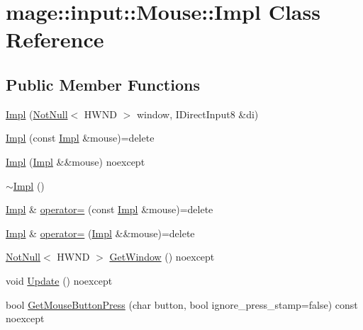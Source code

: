 \hypertarget{classmage_1_1input_1_1_mouse_1_1_impl}{}\section{mage\+:\+:input\+:\+:Mouse\+:\+:Impl Class Reference}
\label{classmage_1_1input_1_1_mouse_1_1_impl}
\subsection*{Public Member Functions}
\begin{DoxyCompactItemize}
\item 
\hyperlink{classmage_1_1input_1_1_mouse_1_1_impl_a123b86c874208b15d61eae54a2633a68}{Impl} (\hyperlink{namespacemage_a8769f9d670d6b585ea306cb1062af94b}{Not\+Null}$<$ H\+W\+ND $>$ window, I\+Direct\+Input8 \&di)
\item 
\hyperlink{classmage_1_1input_1_1_mouse_1_1_impl_a8d489809ad53f9e7310983180bc7be98}{Impl} (const \hyperlink{classmage_1_1input_1_1_mouse_1_1_impl}{Impl} \&mouse)=delete
\item 
\hyperlink{classmage_1_1input_1_1_mouse_1_1_impl_a8eed1c46d32964cb28b999b28c39a2b7}{Impl} (\hyperlink{classmage_1_1input_1_1_mouse_1_1_impl}{Impl} \&\&mouse) noexcept
\item 
\hyperlink{classmage_1_1input_1_1_mouse_1_1_impl_a0e1f64d2fadbd25d216e0495d141b867}{$\sim$\+Impl} ()
\item 
\hyperlink{classmage_1_1input_1_1_mouse_1_1_impl}{Impl} \& \hyperlink{classmage_1_1input_1_1_mouse_1_1_impl_a7ca0f042e7d201c312ab26f4bb9e0604}{operator=} (const \hyperlink{classmage_1_1input_1_1_mouse_1_1_impl}{Impl} \&mouse)=delete
\item 
\hyperlink{classmage_1_1input_1_1_mouse_1_1_impl}{Impl} \& \hyperlink{classmage_1_1input_1_1_mouse_1_1_impl_ae994602de981918d84a0b836a403f941}{operator=} (\hyperlink{classmage_1_1input_1_1_mouse_1_1_impl}{Impl} \&\&mouse)=delete
\item 
\hyperlink{namespacemage_a8769f9d670d6b585ea306cb1062af94b}{Not\+Null}$<$ H\+W\+ND $>$ \hyperlink{classmage_1_1input_1_1_mouse_1_1_impl_a53b080d8835ebb887fcadbba57131f00}{Get\+Window} () noexcept
\item 
void \hyperlink{classmage_1_1input_1_1_mouse_1_1_impl_a572b3d4c288bb91d07dc2ae1d57b6e3d}{Update} () noexcept
\item 
bool \hyperlink{classmage_1_1input_1_1_mouse_1_1_impl_acba58fb9b1f44679545d3453c88c0d59}{Get\+Mouse\+Button\+Press} (char button, bool ignore\+\_\+press\+\_\+stamp=false) const noexcept

\end{DoxyCompactItemize}
